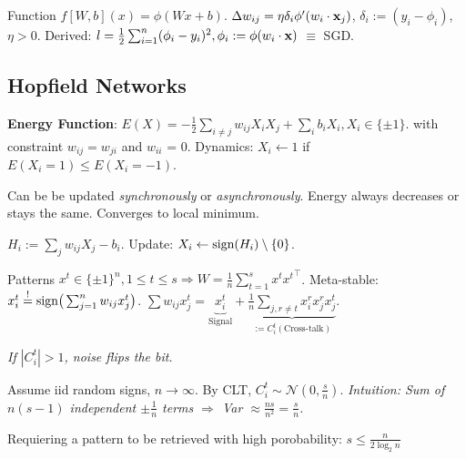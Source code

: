 \begin{definition}
    Function \(f[W, b](x) = \phi(Wx + b)\).
    \(\Delta w_{ij} = \eta \delta_i \phi'(w_i \cdot \vb{x}_j)\), \(\delta_i := (y_i - \phi_i)\), \(\eta > 0\). Derived: \(l = \frac{1}{2} \sum_{i=1}^n (\phi_i - y_i)^2, \phi_i := \phi(w_i \cdot \vb{x})\) \(\equiv\) SGD.
\end{definition}

\subsection{Hopfield Networks}

\textbf{Energy Function}: \(E(X) = - \frac{1}{2} \sum_{i \neq j} w_{ij} X_i X_j + \sum_i b_i X_i, X_i \in \{\pm 1\}.\) with constraint \(w_{ij} = w_{ji}\) and \(w_{ii}\) = 0.
Dynamics: \(X_i \gets 1\) if \(E(X_i = 1) \leq E(X_i = -1)\).

Can be be updated \textit{synchronously} or \textit{asynchronously}. Energy always decreases or stays the same. Converges to local minimum.

\begin{definition}
    \(H_i := \sum_j w_{ij} X_j - b_i\). Update: \(X_i \gets \text{sign}(H_i) \setminus \{0\}\).
\end{definition}

\begin{definition}
    Patterns $x^t \in \{\pm 1\}^n, 1 \leq t \leq s \Rightarrow W = \frac{1}{n} \sum_{t=1}^s x^t {x^t}^\top$.
    Meta-stable: $x_i^t \overset{!}{=} \text{sign}\big(\sum_{j=1}^n w_{ij} x_j^t\big)$. 
    $\sum w_{ij} x_j^t = \underbrace{x_i^t}_{\text{Signal}} + \underbrace{\frac{1}{n} \sum_{j, r \neq t} x_i^r x_j^r x_j^t}_{:= C_i^t (\text{Cross-talk})}$.

    \vspace{-1.5em}
    \textit{If $|C_i^t| > 1$, noise flips the bit.}
\end{definition}

\begin{definition}[Capacity]
    Assume iid random signs, $n \to \infty$. By CLT, $C_i^t \sim \mathcal{N}(0, \frac{s}{n})$.
    \textit{Intuition: Sum of $n(s-1)$ independent $\pm \frac{1}{n}$ terms $\Rightarrow$ Var $\approx \frac{ns}{n^2} = \frac{s}{n}$.}

    Requiering a pattern to be retrieved with high porobability: \(s \leq \frac{n}{2 \log_2 n}\)
\end{definition}